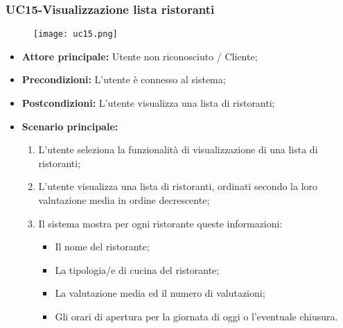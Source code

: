 \nonstopmode
\pagebreak
\subsubsection{UC15-Visualizzazione lista ristoranti}
\begin{figure}[h] \texttt{[image: uc15.png]} \end{figure}
\begin{itemize}
\item \textbf{Attore principale:} Utente non riconosciuto / Cliente;
\item \textbf{Precondizioni:} L'utente è connesso al sistema;
\item \textbf{Postcondizioni:} L'utente visualizza una lista di ristoranti;
\item \textbf{Scenario principale:}
\begin{enumerate}
    \item L'utente seleziona la funzionalità di visualizzazione di una lista di ristoranti;
    \item L'utente visualizza una lista di ristoranti, ordinati secondo la loro valutazione media in ordine decrescente;
    \item Il sistema mostra per ogni ristorante queste informazioni:
       \begin{itemize}
           \item Il nome del ristorante;
           \item La tipologia/e di cucina del ristorante;
           \item La valutazione media ed il numero di valutazioni;
           \item Gli orari di apertura per la giornata di oggi o l'eventuale chiusura.
       \end{itemize}
\end{enumerate}
\end{itemize}

\pagebreak
